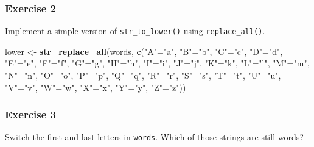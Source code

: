 \documentclass[]{book}
\newenvironment{Shaded}{\begin{snugshade}}{\end{snugshade}}
\newcommand{\KeywordTok}[1]{\textcolor[rgb]{0.13,0.29,0.53}{\textbf{#1}}}
\newcommand{\NormalTok}[1]{#1}
\newcommand{\StringTok}[1]{\textcolor[rgb]{0.31,0.60,0.02}{#1}}
\theoremstyle{plain}
\theoremstyle{remark}
\theoremstyle{definition}
\theoremstyle{definition}
\theoremstyle{definition}
\theoremstyle{remark}
\begin{document}
\hypertarget{exercise-2-37}{%
\subsubsection{Exercise 2}\label{exercise-2-37}}

Implement a simple version of \texttt{str\_to\_lower()} using
\texttt{replace\_all()}.

\begin{Shaded}
\begin{Highlighting}[]
\NormalTok{lower <-}\StringTok{ }\KeywordTok{str_replace_all}\NormalTok{(words, }\KeywordTok{c}\NormalTok{(}\StringTok{"A"}\NormalTok{=}\StringTok{"a"}\NormalTok{, }\StringTok{"B"}\NormalTok{=}\StringTok{"b"}\NormalTok{, }\StringTok{"C"}\NormalTok{=}\StringTok{"c"}\NormalTok{, }\StringTok{"D"}\NormalTok{=}\StringTok{"d"}\NormalTok{, }\StringTok{"E"}\NormalTok{=}\StringTok{"e"}\NormalTok{, }\StringTok{"F"}\NormalTok{=}\StringTok{"f"}\NormalTok{, }\StringTok{"G"}\NormalTok{=}\StringTok{"g"}\NormalTok{, }\StringTok{"H"}\NormalTok{=}\StringTok{"h"}\NormalTok{, }\StringTok{"I"}\NormalTok{=}\StringTok{"i"}\NormalTok{, }\StringTok{"J"}\NormalTok{=}\StringTok{"j"}\NormalTok{, }\StringTok{"K"}\NormalTok{=}\StringTok{"k"}\NormalTok{, }\StringTok{"L"}\NormalTok{=}\StringTok{"l"}\NormalTok{, }\StringTok{"M"}\NormalTok{=}\StringTok{"m"}\NormalTok{, }\StringTok{"N"}\NormalTok{=}\StringTok{"n"}\NormalTok{, }\StringTok{"O"}\NormalTok{=}\StringTok{"o"}\NormalTok{, }\StringTok{"P"}\NormalTok{=}\StringTok{"p"}\NormalTok{, }\StringTok{"Q"}\NormalTok{=}\StringTok{"q"}\NormalTok{, }\StringTok{"R"}\NormalTok{=}\StringTok{"r"}\NormalTok{, }\StringTok{"S"}\NormalTok{=}\StringTok{"s"}\NormalTok{, }\StringTok{"T"}\NormalTok{=}\StringTok{"t"}\NormalTok{, }\StringTok{"U"}\NormalTok{=}\StringTok{"u"}\NormalTok{, }\StringTok{"V"}\NormalTok{=}\StringTok{"v"}\NormalTok{, }\StringTok{"W"}\NormalTok{=}\StringTok{"w"}\NormalTok{, }\StringTok{"X"}\NormalTok{=}\StringTok{"x"}\NormalTok{, }\StringTok{"Y"}\NormalTok{=}\StringTok{"y"}\NormalTok{, }\StringTok{"Z"}\NormalTok{=}\StringTok{"z"}\NormalTok{))}
\end{Highlighting}
\end{Shaded}

\hypertarget{exercise-3-31}{%
\subsubsection{Exercise 3}\label{exercise-3-31}}

Switch the first and last letters in \texttt{words}. Which of those
strings are still words?
\end{document}
